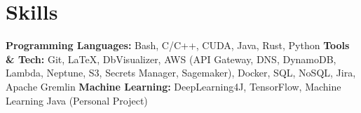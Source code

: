 ﻿
\section{Skills}

\textbf{Programming Languages: } Bash, C/C++, CUDA, Java, Rust, Python
\bigbreak
\textbf{Tools \& Tech: } Git, \LaTeX, DbVisualizer, AWS (API Gateway, DNS, DynamoDB, Lambda, Neptune, S3, Secrets Manager, Sagemaker), Docker, SQL, NoSQL, Jira, Apache Gremlin
\bigbreak
\textbf{Machine Learning: } DeepLearning4J, TensorFlow, Machine Learning Java (Personal Project)